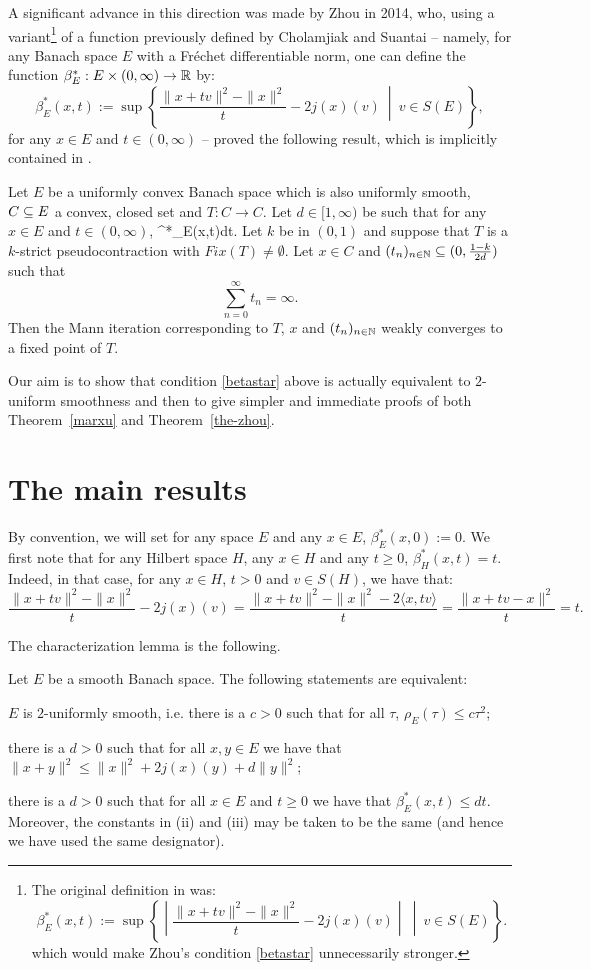 \documentclass{article}
\begin{document}
A significant advance in this direction was made by Zhou in 2014, who, using a variant\footnote{The original definition in \cite[Lemma 3.2]{ChoSua13} was: 
$$\beta^*_E(x,t):=\sup\left\{\middle|\frac{\|x+tv\|^2-\|x\|^2}t-2j(x)(v)\middle|\ \middle|\ v \in S(E)\right\}.$$
which would make Zhou's condition \eqref{betastar} unnecessarily stronger.} of a function previously defined by Cholamjiak and Suantai -- namely, for any Banach space $E$ with a Fréchet differentiable norm, one can define the function $\beta^*_E: E \times (0,\infty) \to {\mathbb R}$ by:
$$\beta^*_E(x,t):=\sup\left\{\frac{\|x+tv\|^2-\|x\|^2}t-2j(x)(v)\ \middle|\ v \in S(E)\right\},$$
for any $x \in E$ and $t \in (0, \infty)$ -- proved the following result, which is implicitly contained in \cite[Theorem 3.1]{Zho14}.

\label{the-zhou}
Let $E$ be a uniformly convex Banach space which is also uniformly smooth, $C\subseteq E$ a convex, closed set and $T: C \to C$. Let $d \in [1, \infty)$ be such that for any $x \in E$ and $t \in (0, \infty)$,
\beq
\beta^*_E(x,t)\leq dt.\label{betastar}
\eeq
Let $k$ be in $(0,1)$ and suppose that $T$ is a $k$-strict pseudocontraction with $Fix(T)\neq\emptyset$. Let $x \in C$ and $(t_n)_{n \in {\mathbb N}} \subseteq (0,\frac{1-k}{2d})$ such that
$$\sum_{n=0}^\infty t_n = \infty.$$
Then the Mann iteration corresponding to $T$, $x$ and $(t_n)_{n \in {\mathbb N}}$ weakly converges to a fixed point of $T$.
\ethm

Our aim is to show that condition \eqref{betastar} above is actually equivalent to $2$-uniform smoothness and then to give simpler and immediate proofs of both Theorem~\ref{marxu} and Theorem~\ref{the-zhou}.

\section{The main results}

By convention, we will set for any space $E$ and any $x \in E$, $\beta^*_E(x,0):=0$. We first note that for any Hilbert space $H$, any $x\in H$ and any $t \geq 0$, $\beta^*_H(x,t)=t$. Indeed, in that case, for any $x \in H$, $t>0$ and $v \in S(H)$, we have that:
$$\frac{\|x+tv\|^2-\|x\|^2}t-2j(x)(v) = \frac{\|x+tv\|^2-\|x\|^2 -2\langle x,tv \rangle}t = \frac{\|x+tv-x\|^2}t = t.$$

The characterization lemma is the following.

\blem\label{l1}
Let $E$ be a smooth Banach space. The following statements are equivalent:
\be
\item $E$ is $2$-uniformly smooth, i.e. there is a $c>0$ such that for all $\tau$, $\rho_E(\tau) \leq c \tau^2$;
\item there is a $d>0$ such that for all $x,y \in E$ we have that $\|x+y\|^2 \leq \|x\|^2 +2j(x)(y)+ d\|y\|^2$;
\item there is a $d>0$ such that for all $x \in E$ and $t \geq 0$ we have that $\beta^*_E(x,t)\leq dt$.
\ee
Moreover, the constants in (ii) and (iii) may be taken to be the same (and hence we have used the same designator).
\elem
\end{document}

